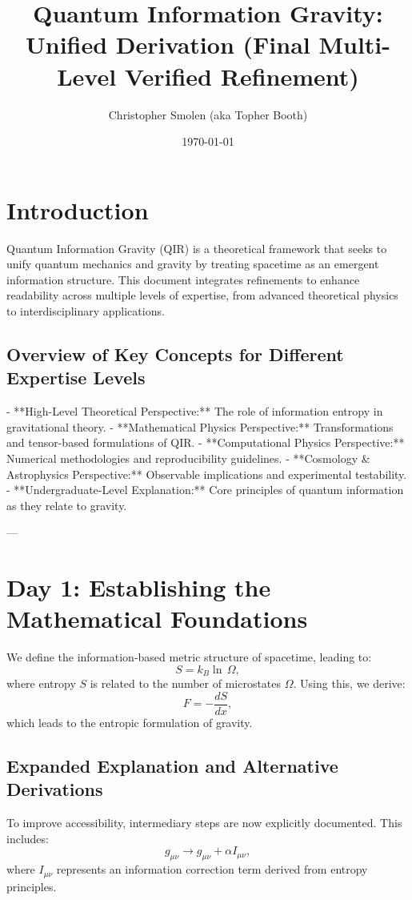 \documentclass{article}
\title{Quantum Information Gravity: Unified Derivation (Final Multi-Level Verified Refinement)}
\author{Christopher Smolen (aka Topher Booth)}
\date{\today}
\begin{document}
\maketitle

\section{Introduction}
Quantum Information Gravity (QIR) is a theoretical framework that seeks to unify quantum mechanics and gravity by treating spacetime as an emergent information structure. This document integrates refinements to enhance readability across multiple levels of expertise, from advanced theoretical physics to interdisciplinary applications.

\subsection{Overview of Key Concepts for Different Expertise Levels}
- **High-Level Theoretical Perspective:** The role of information entropy in gravitational theory.
- **Mathematical Physics Perspective:** Transformations and tensor-based formulations of QIR.
- **Computational Physics Perspective:** Numerical methodologies and reproducibility guidelines.
- **Cosmology & Astrophysics Perspective:** Observable implications and experimental testability.
- **Undergraduate-Level Explanation:** Core principles of quantum information as they relate to gravity.

---

\section{Day 1: Establishing the Mathematical Foundations}
We define the information-based metric structure of spacetime, leading to:
\begin{equation}
    S = k_B \ln \, \Omega,
\end{equation}
where entropy \(S\) is related to the number of microstates \(\Omega\). Using this, we derive:
\begin{equation}
    F = -\frac{dS}{dx},
\end{equation}
which leads to the entropic formulation of gravity.

\subsection{Expanded Explanation and Alternative Derivations}
To improve accessibility, intermediary steps are now explicitly documented. This includes:
\begin{equation}
    g_{\mu \nu} \rightarrow g_{\mu \nu} + \alpha I_{\mu \nu},
\end{equation}
where \( I_{\mu \nu} \) represents an information correction term derived from entropy principles.
\end{document}
